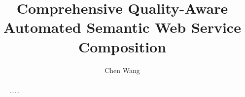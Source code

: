 \documentclass[11pt
              , a4paper
              , twoside
              , openright
              ]{report}
\title{Comprehensive Quality-Aware Automated Semantic Web Service Composition}
\author{Chen Wang}
\begin{document}
\frontmatter



\begin{abstract}

......
\end{abstract}


\maketitle

%

\tableofcontents



\mainmatter








\backmatter





\end{document}
